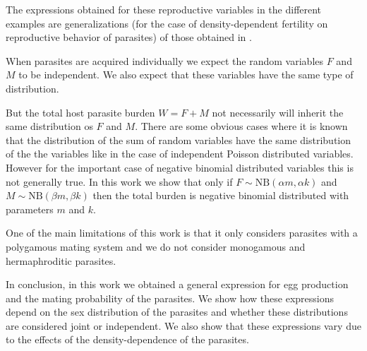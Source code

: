 \documentclass[useAMS,referee,usenatbib]{biom}
\begin{document}
The  expressions obtained for these reproductive variables in the different examples are generalizations (for the case of density-dependent fertility on reproductive behavior of parasites) of those obtained in \cite{leyton1968stochastic,may1977togetherness,may1993biased}.



When parasites are acquired individually we expect the random variables $F$ and $M$ to be independent. We also expect that these variables have the same type of distribution. 


But the total host parasite burden $W=F+M$ not necessarily will inherit the same distribution os $F$ and $M$. There are some obvious cases where it is known that the distribution of the sum of random variables have the same distribution of the the variables like in the case of independent Poisson distributed variables. However for the important case of negative binomial distributed variables this is not generally true. In this work we show that 
only if
$F\sim \mathrm{NB}(\alpha m,\alpha k)$ and $ M\sim \mathrm{NB}(\beta m,\beta k)$ then the total burden is negative binomial distributed with parameters $m$ and $k$. 



One of the main limitations of this work is that it only considers parasites with a polygamous mating system and we do not consider monogamous and hermaphroditic parasites.

In conclusion, in this work we obtained a general expression for egg production and the mating probability of the parasites. We show how these expressions depend on the sex distribution of the parasites and whether these distributions are considered joint or independent. 
We also show that these expressions vary due to the effects of the density-dependence of the parasites.

\
\end{document}
